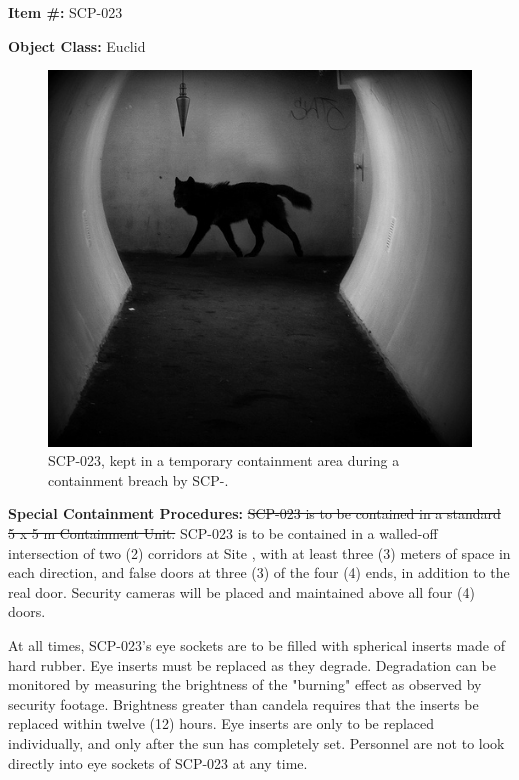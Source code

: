 
\textbf{Item \#:} SCP-023

\textbf{Object Class:} Euclid

\begin{figure}[h]
\begin{center}
\includegraphics[scale=0.5]{scp/023.jpg}
\linebreak SCP-023, kept in a temporary containment area during a containment breach by SCP-.
\end{center}
\end{figure}

\textbf{Special Containment Procedures:} \sout{SCP-023 is to be contained in a standard 5 x 5 m Containment Unit.} SCP-023 is to be contained in a walled-off intersection of two (2) corridors at Site , with at least three (3) meters of space in each direction, and false doors at three (3) of the four (4) ends, in addition to the real door. Security cameras will be placed and maintained above all four (4) doors.

At all times, SCP-023's eye sockets are to be filled with spherical inserts made of hard rubber. Eye inserts must be replaced as they degrade. Degradation can be monitored by measuring the brightness of the "burning" effect as observed by security footage. Brightness greater than  candela requires that the inserts be replaced within twelve (12) hours. Eye inserts are only to be replaced individually, and only after the sun has completely set. Personnel are not to look directly into eye sockets of SCP-023 at any time.


